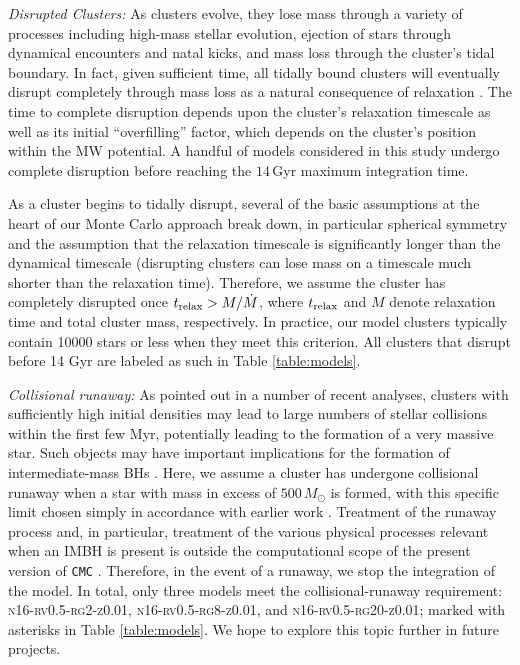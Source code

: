 \documentclass[twocolumn,tighten]{aastex63}
\begin{document}
\textit{Disrupted Clusters:} As clusters evolve, they lose mass through a variety of processes including high-mass stellar evolution, ejection of stars through dynamical encounters and natal kicks, and mass loss through the cluster's tidal boundary. In fact, given sufficient time, all tidally bound clusters will eventually disrupt completely through mass loss as a natural consequence of relaxation \citep[see, e.g.,][]{HeggieHut2003}. The time to complete disruption depends upon the cluster's relaxation timescale as well as its initial ``overfilling'' factor, which depends on the cluster's position within the MW potential. A handful of models considered in this study undergo complete disruption before reaching the $14\,$Gyr maximum integration time.

As a cluster begins to tidally disrupt, several of the basic assumptions at the heart of our Monte Carlo approach break down, in particular spherical symmetry and the assumption that the relaxation timescale is significantly longer than the dynamical timescale (disrupting clusters can lose mass on a timescale much shorter than the relaxation time). Therefore, we assume the cluster has completely disrupted once $t_{\rm{relax}} > M/\dot{M}$, where $t_{\rm{relax}}$ and $M$ denote relaxation time and total cluster mass, respectively. In practice, our model clusters typically contain 10000 stars or less when they meet this criterion. All clusters that disrupt before 14 Gyr are labeled as such in Table \ref{table:models}.

\textit{Collisional runaway:} As pointed out in a number of recent analyses, clusters with sufficiently high initial densities may lead to large numbers of stellar collisions within the first few Myr, potentially leading to the formation of a very massive star. Such objects may have important implications for the formation of intermediate-mass BHs \citep[IMBHs; e.g.,][]{Ebisuzaki2001,PortegiesZwartMcMillan2002,Gurkan2004,Freitag2006,PortegiesZwart2010,Goswami2012}. Here, we assume a cluster has undergone collisional runaway when a star with mass in excess of $500\,M_{\odot}$ is formed, with this specific limit chosen simply in accordance with earlier work \citep[e.g.,][]{Gurkan2004}.
Treatment of the runaway process and, in particular, treatment of the various physical processes relevant when an IMBH is present is outside the computational scope of the present version of \texttt{CMC}  \citep[however, for a recent attempt at incorporating within \texttt{CMC} the various processes relevant to the presence of an IMBH, see][]{Umbreit2012}. Therefore, in the event of a runaway, we stop the integration of the model. In total, only three models meet the collisional-runaway requirement: \textsc{n16-rv0.5-rg2-z0.01}, \textsc{n16-rv0.5-rg8-z0.01}, and \textsc{n16-rv0.5-rg20-z0.01}; marked with asterisks in Table \ref{table:models}. We hope to explore this topic further in future projects.
\end{document}
